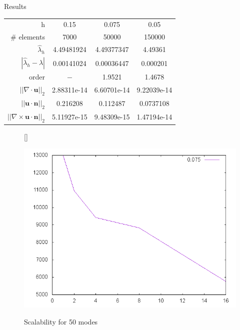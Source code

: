 \documentclass{beamer}
\newcommand{\curl}{{\nabla\times}}
\renewcommand{\div}{{\nabla\cdot}}
\begin{document}
\begin{frame}{Results}
  \begin{table}[H]
    \small
    \centering
    \begin{tabular}{r|c|c|c}
      h & 0.15 & 0.075 & 0.05 \\
      \# elements & 7000 & 50000 & 150000 \\
      \hline
      $\widehat{\lambda}_h$ & 4.49481924 & 4.49377347 & 4.49361\\
      $|\widehat{\lambda}_h-\lambda|$ & 0.00141024 & 0.00036447 & 0.000201 \\
      order & $-$ & 1.9521 & 1.4678 \\
      \hline
      $||\div\mathbf{u}||_2$ & 2.88311e-14 & 6.60701e-14 & 9.22039e-14 \\
      $||\mathbf{u}\cdot\mathbf{n}||_2$ & 0.216208 & 0.112487 & 0.0737108 \\
      $||\curl\mathbf{u}\cdot\mathbf{n}||_2$ & 5.11927e-15 & 9.48309e-15 & 1.47194e-14 \\
    \end{tabular}
  \end{table}
  \begin{figure}[H]
    [\FBwidth]
             {\caption{Scalability for 50 modes}}
             {\includegraphics[scale=0.3]{eigen}}\centering
  \end{figure}
\end{frame}
\end{document}
